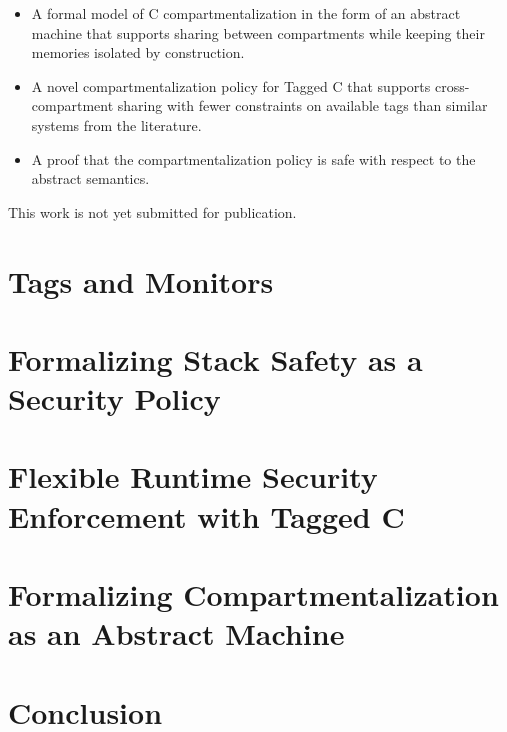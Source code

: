 \documentclass{report}
\begin{document}
\begin{itemize}
\item A formal model of C compartmentalization in the form of an abstract machine that
  supports sharing between compartments while keeping their memories isolated by construction.
\item A novel compartmentalization policy for Tagged C that supports cross-compartment
  sharing with fewer constraints on available tags than similar systems from the literature.
\item A proof that the compartmentalization policy is safe with respect to the abstract semantics.
\end{itemize}

This work is not yet submitted for publication.

\chapter{Tags and Monitors}
\label{ch:background}

\chapter{Formalizing Stack Safety as a Security Policy}
\label{ch:stacksafety}

\chapter{Flexible Runtime Security Enforcement with Tagged C}
\label{ch:taggedc}

\chapter{Formalizing Compartmentalization as an Abstract Machine}
\label{ch:compartments}

\chapter{Conclusion}



\end{document}
